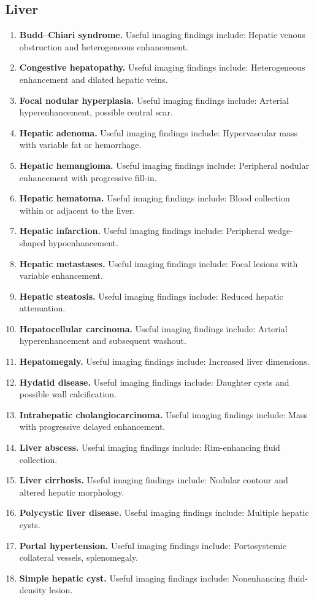\subsection{Liver}
\begin{enumerate}[leftmargin=*,itemsep=0.45em,topsep=0.4em]
\item \textbf{Budd--Chiari syndrome.} Useful imaging findings include: Hepatic venous obstruction and heterogeneous enhancement.
\item \textbf{Congestive hepatopathy.} Useful imaging findings include: Heterogeneous enhancement and dilated hepatic veins.
\item \textbf{Focal nodular hyperplasia.} Useful imaging findings include: Arterial hyperenhancement, possible central scar.
\item \textbf{Hepatic adenoma.} Useful imaging findings include: Hypervascular mass with variable fat or hemorrhage.
\item \textbf{Hepatic hemangioma.} Useful imaging findings include: Peripheral nodular enhancement with progressive fill-in.
\item \textbf{Hepatic hematoma.} Useful imaging findings include: Blood collection within or adjacent to the liver.
\item \textbf{Hepatic infarction.} Useful imaging findings include: Peripheral wedge-shaped hypoenhancement.
\item \textbf{Hepatic metastases.} Useful imaging findings include: Focal lesions with variable enhancement.
\item \textbf{Hepatic steatosis.} Useful imaging findings include: Reduced hepatic attenuation.
\item \textbf{Hepatocellular carcinoma.} Useful imaging findings include: Arterial hyperenhancement and subsequent washout.
\item \textbf{Hepatomegaly.} Useful imaging findings include: Increased liver dimensions.
\item \textbf{Hydatid disease.} Useful imaging findings include: Daughter cysts and possible wall calcification.
\item \textbf{Intrahepatic cholangiocarcinoma.} Useful imaging findings include: Mass with progressive delayed enhancement.
\item \textbf{Liver abscess.} Useful imaging findings include: Rim-enhancing fluid collection.
\item \textbf{Liver cirrhosis.} Useful imaging findings include: Nodular contour and altered hepatic morphology.
\item \textbf{Polycystic liver disease.} Useful imaging findings include: Multiple hepatic cysts.
\item \textbf{Portal hypertension.} Useful imaging findings include: Portosystemic collateral vessels, splenomegaly.
\item \textbf{Simple hepatic cyst.} Useful imaging findings include: Nonenhancing fluid-density lesion.
\end{enumerate}

